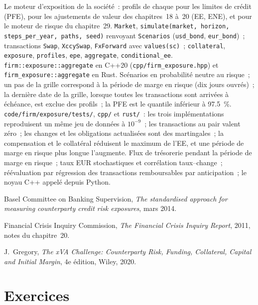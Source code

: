\begin{build}
 Le moteur d'exposition de la société~: profils de chaque  pour les limites de crédit
(PFE), pour les ajustements de valeur des chapitres~18 à~20 (EE, ENE), et pour le
moteur de risque du chapitre~29. 
\texttt{Market}, \texttt{simulate(market, horizon, steps\_per\_year,
paths, seed)} renvoyant \texttt{Scenarios} (\texttt{usd\_bond}, \texttt{eur\_bond})~;
transactions \texttt{Swap}, \texttt{XccySwap}, \texttt{FxForward} avec \texttt{values(sc)}~;
\texttt{collateral}, \texttt{exposure}, \texttt{profiles}, \texttt{epe},
\texttt{aggregate}, \texttt{conditional\_ee}. \texttt{firm::exposure::aggregate} en C++20
(\texttt{cpp/firm\_exposure.hpp}) et \texttt{firm\_exposure::aggregate} en Rust.
 Scénarios en probabilité neutre au risque~; un pas de la grille correspond à la période de marge en risque (dix
jours ouvrés)~; la dernière date de la grille, lorsque toutes les transactions sont arrivées à échéance, est exclue des
profils~; la PFE est le quantile inférieur à 97.5~\%.
 \texttt{code/firm/exposure/tests/}, \texttt{cpp/} et
\texttt{rust/}~: les trois implémentations reproduisent un même jeu de données à $10^{-9}$~; les transactions au pair
valent zéro~; les changes et les obligations actualisées sont des martingales~; la compensation et le collatéral réduisent le maximum de
l'EE, et une période de marge en risque plus longue l'augmente.
 Flux de trésorerie pendant la période de marge en risque~; taux EUR stochastiques et
corrélation taux--change~; réévaluation par régression des transactions remboursables par anticipation~; le noyau C++ appelé
depuis Python.
\end{build}

\begin{omsources}
\item Basel Committee on Banking Supervision, \emph{The standardised approach for measuring
counterparty credit risk exposures}, mars 2014.
\item Financial Crisis Inquiry Commission, \emph{The Financial Crisis Inquiry Report},
2011, notes du chapitre~20.
\item J.~Gregory, \emph{The xVA Challenge: Counterparty Risk, Funding, Collateral, Capital and Initial
Margin}, 4e édition, Wiley, 2020.
\end{omsources}

\section{Exercices}

